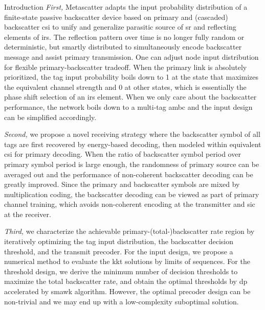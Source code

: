 \documentclass[journal]{IEEEtran}
\begin{document}
\begin{section}{Introduction}
	\emph{First,} Metascatter adapts the input probability distribution of a finite-state passive backscatter device based on primary and (cascaded) backscatter \gls{csi} to unify and generalize parasitic source of \gls{sr} and reflecting elements of \gls{irs}.
	The reflection pattern over time is no longer fully random or deterministic, but smartly distributed to simultaneously encode backscatter message and assist primary transmission.
	One can adjust node input distribution for flexible primary-backscatter tradeoff.
	When the primary link is absolutely prioritized, the tag input probability boils down to \num{1} at the state that maximizes the equivalent channel strength and \num{0} at other states, which is essentially the phase shift selection of an \gls{irs} element.
	When we only care about the backscatter performance, the network boils down to a multi-tag \gls{ambc} and the input design can be simplified accordingly.

	\emph{Second,} we propose a novel receiving strategy where the backscatter symbol of all tags are first recovered by energy-based decoding, then modeled within equivalent \gls{csi} for primary decoding.
	When the ratio of backscatter symbol period over primary symbol period is large enough, the randomness of primary source can be averaged out and the performance of non-coherent backscatter decoding can be greatly improved.
	Since the primary and backscatter symbols are mixed by multiplication coding, the backscatter decoding can be viewed as part of primary channel training, which avoids non-coherent encoding at the transmitter and \gls{sic} at the receiver.

	\emph{Third,} we characterize the achievable primary-(total-)backscatter rate region by iteratively optimizing the tag input distribution, the backscatter decision threshold, and the transmit precoder.
	For the input design, we propose a numerical method to evaluate the \gls{kkt} solutions by limits of sequences.
	For the threshold design, we derive the minimum number of decision thresholds to maximize the total backscatter rate, and obtain the optimal thresholds by \gls{dp} accelerated by \gls{smawk} algorithm.
	However, the optimal precoder design can be non-trivial and we may end up with a low-complexity suboptimal solution.

\end{section}
\end{document}
